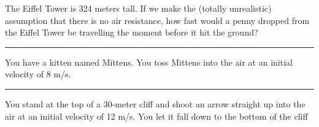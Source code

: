 \documentclass[12pt]{exam}
\begin{document}
\def\mystrut{\protect\rule[-2.2ex]{0ex}{2.2ex}} 
\qformat{ \textbf{Task \#\thequestion}
  \ifthenelse{\equal{\thequestion}{\thequestiontitle}}
    {}
    {: \emph{\thequestiontitle}}
  \mystrut  \hfill}
\begin{questions}

  \Large

  \question  
    The Eiffel Tower is 324 meters tall.  If we make the (totally unrealistic) assumption that there is no air resistance, how fast would a penny dropped from the Eiffel Tower be travelling the moment before it hit the ground?
    \vs\hrule\vs

  \question
    You have a kitten named Mittens.  You toss Mittens into the air at an initial velocity of 8 m/s.  
    
    \vs\hrule\vs


  \question
    You stand at the top of a 30-meter cliff and shoot an arrow straight up into the air at an initial velocity of 12 m/s.  You let it fall down to the bottom of the cliff

    \vspace{30em}
 \end{questions}
\end{document}

